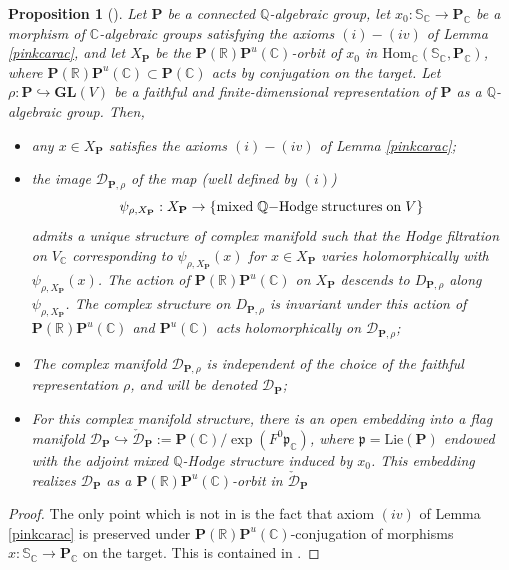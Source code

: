 \documentclass[10pt]{article}
\numberwithin{equation}{subsection}
\theoremstyle{plain}
\newtheorem{proposition}[theorem]{Proposition}
\theoremstyle{definition}
\theoremstyle{remark}
\newcommand{\lie}{\mathrm{Lie}}
\newcommand{\Q}{\mathbb Q}
\newcommand{\C}{\mathbb C}
\newcommand{\R}{\mathbb R}
\newcommand{\s}{\mathbb S}
\newcommand{\pp}{\mathbf P}
\newcommand{\Hom}{\mathrm{Hom}}
\newcommand{\gl}{\mathbf{GL}}
\newcommand{\para}{\mathfrak{p}}
\begin{document}
\begin{proposition}[{\cite[(1.7)]{pinkthese}}] \label{hodgedat}
Let $\pp$ be a connected $\Q$-algebraic group, let $x_0 : \s_\C \rightarrow \pp_\C$ be a morphism of $\C$-algebraic groups satisfying the axioms $(i)-(iv)$ of Lemma \ref{pinkcarac}, and let $X_\pp$ be the $\pp(\R)\pp^u(\C)$-orbit of $x_0$ in $\Hom_\C(\s_\C, \pp_\C)$, where $\pp(\R)\pp^u(\C) \subset \pp(\C)$ acts by conjugation on the target. Let $\rho : \pp \hookrightarrow \gl(V)$ be a faithful and finite-dimensional representation of $\pp$ as a $\Q$-algebraic group. Then,
\begin{itemize}
\item[(i)] any $x \in X_{\pp}$ satisfies the axioms $(i)-(iv)$ of Lemma \ref{pinkcarac};
\item[(ii)] the image $\mathcal{D}_{\pp, \rho}$ of the map (well defined by $(i)$)
\[
\psi_{\rho,X_\pp} : X_\pp \rightarrow \{\mathrm{mixed} \hspace{0.1cm} \Q\mathrm{-Hodge} \hspace{0.1cm} \mathrm{structures} \hspace{0.1cm} \mathrm{on} \hspace{0.1cm} V\}
\]
admits a unique structure of complex manifold such that the Hodge filtration on $V_\C$  corresponding to $\psi_{\rho,X_\pp}(x)$ for $x \in X_\pp$ varies holomorphically with $\psi_{\rho, X_\pp}(x)$. The action of $\pp(\R)\pp^u(\C)$ on $X_\pp$ descends to $D_{\pp, \rho}$ along $\psi_{\rho, X_\pp}$. The complex structure on $D_{\pp, \rho}$ is invariant under this action of $\pp(\R)\pp^u(\C)$ and $\pp^u(\C)$ acts holomorphically on $\mathcal{D}_{\pp, \rho}$;
\item[(iii)] The complex manifold $\mathcal{D}_{\pp, \rho}$ is independent of the choice of the faithful representation $\rho$, and will be denoted $\mathcal{D}_\pp$;
\item[(iv)] For this complex manifold structure, there is an open embedding into a flag manifold $\mathcal{D}_\pp \hookrightarrow \check{\mathcal{D}}_\pp := \pp(\C)/\exp(F^0 \para_\C)$, where $\para = \lie(\pp)$ endowed with the adjoint mixed $\Q$-Hodge structure induced by $x_0$. This embedding realizes $\mathcal{D}_\pp$ as a $\pp(\R)\pp^u(\C)$-orbit in $\check{\mathcal{D}}_\pp$
\end{itemize}
\end{proposition}
\begin{proof}
The only point which is not in \cite[(1.7)]{pinkthese} is the fact that axiom $(iv)$ of Lemma \ref{pinkcarac} is preserved under $\pp(\R)\pp^u(\C)$-conjugation of morphisms $x : \s_\C \rightarrow \pp_\C$ on the target. This is contained in \cite[(1.12)]{pinkthese}.
\end{proof}
\end{document}
